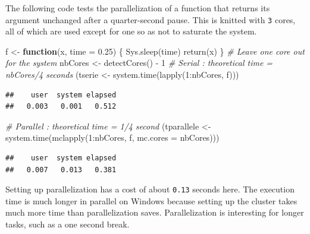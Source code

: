 \documentclass[
  12pt,
  american,
  a4paper,
  extrafontsizes,onecolumn,openright
  ]{memoir}
\newenvironment{Shaded}{\begin{snugshade}}{\end{snugshade}}
\newcommand{\AttributeTok}[1]{\textcolor[rgb]{0.77,0.63,0.00}{#1}}
\newcommand{\CommentTok}[1]{\textcolor[rgb]{0.56,0.35,0.01}{\textit{#1}}}
\newcommand{\ControlFlowTok}[1]{\textcolor[rgb]{0.13,0.29,0.53}{\textbf{#1}}}
\newcommand{\DecValTok}[1]{\textcolor[rgb]{0.00,0.00,0.81}{#1}}
\newcommand{\FloatTok}[1]{\textcolor[rgb]{0.00,0.00,0.81}{#1}}
\newcommand{\FunctionTok}[1]{\textcolor[rgb]{0.00,0.00,0.00}{#1}}
\newcommand{\NormalTok}[1]{#1}
\newcommand{\OtherTok}[1]{\textcolor[rgb]{0.56,0.35,0.01}{#1}}
\newcommand{\SpecialCharTok}[1]{\textcolor[rgb]{0.00,0.00,0.00}{#1}}
\begin{document}
\normalsize

The following code tests the parallelization of a function that returns its argument unchanged after a quarter-second pause.
This is knitted with \texttt{3} cores, all of which are used except for one so as not to saturate the system.

\scriptsize

\begin{Shaded}
\begin{Highlighting}[]
\NormalTok{f }\OtherTok{\textless{}{-}} \ControlFlowTok{function}\NormalTok{(x, }\AttributeTok{time =} \FloatTok{0.25}\NormalTok{) \{}
    \FunctionTok{Sys.sleep}\NormalTok{(time)}
    \FunctionTok{return}\NormalTok{(x)}
\NormalTok{\}}
\CommentTok{\# Leave one core out for the system}
\NormalTok{nbCores }\OtherTok{\textless{}{-}} \FunctionTok{detectCores}\NormalTok{() }\SpecialCharTok{{-}} \DecValTok{1}
\CommentTok{\# Serial : theoretical time = nbCores/4 seconds}
\NormalTok{(tserie }\OtherTok{\textless{}{-}} \FunctionTok{system.time}\NormalTok{(}\FunctionTok{lapply}\NormalTok{(}\DecValTok{1}\SpecialCharTok{:}\NormalTok{nbCores, f)))}
\end{Highlighting}
\end{Shaded}

\begin{verbatim}
##    user  system elapsed 
##   0.003   0.001   0.512
\end{verbatim}

\begin{Shaded}
\begin{Highlighting}[]
\CommentTok{\# Parallel : theoretical time = 1/4 second}
\NormalTok{(tparallele }\OtherTok{\textless{}{-}} \FunctionTok{system.time}\NormalTok{(}\FunctionTok{mclapply}\NormalTok{(}\DecValTok{1}\SpecialCharTok{:}\NormalTok{nbCores, f, }\AttributeTok{mc.cores =}\NormalTok{ nbCores)))}
\end{Highlighting}
\end{Shaded}

\begin{verbatim}
##    user  system elapsed 
##   0.007   0.013   0.381
\end{verbatim}

\normalsize

Setting up parallelization has a cost of about \texttt{0.13} seconds here.
The execution time is much longer in parallel on Windows because setting up the cluster takes much more time than parallelization saves.
Parallelization is interesting for longer tasks, such as a one second break.
\end{document}
